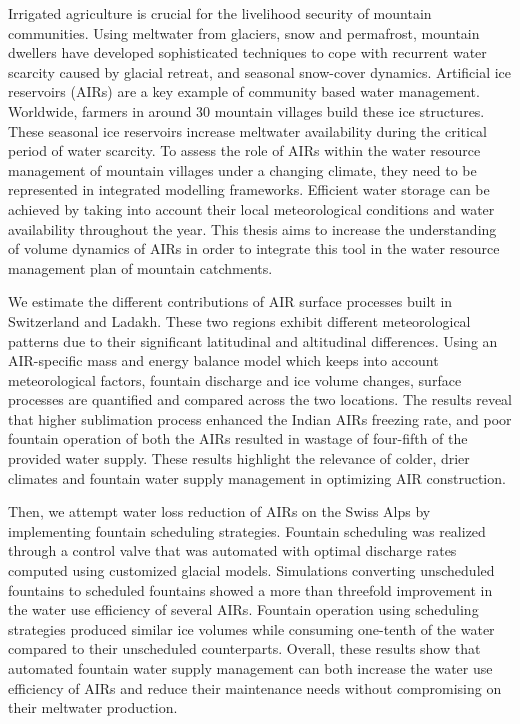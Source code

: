 \label{sec:summary}

Irrigated agriculture is crucial for the livelihood security of mountain communities. Using meltwater from
glaciers, snow and permafrost, mountain dwellers have developed sophisticated techniques to cope with recurrent
water scarcity caused by glacial retreat, and seasonal snow-cover dynamics. Artificial ice
reservoirs (AIRs) are a key example of community based water management. Worldwide, farmers in around 30 mountain
villages build these ice structures. These seasonal ice reservoirs increase meltwater availability during the
critical period of water scarcity. To assess the role of AIRs within the water resource management of
mountain villages under a changing climate, they need to be represented in integrated modelling frameworks.
Efficient water storage can be achieved by taking into account their local meteorological conditions and
water availability throughout the year. This thesis aims to increase the understanding of volume dynamics of
AIRs in order to integrate this tool in the water resource management plan of mountain catchments.

We estimate the different contributions of AIR surface processes built in Switzerland and Ladakh. These two
regions exhibit different meteorological patterns due to their significant latitudinal and altitudinal
differences. Using an AIR-specific mass and energy balance model which keeps into account meteorological
factors, fountain discharge and ice volume changes, surface processes are quantified and compared across the two
locations. The results reveal that higher sublimation process enhanced the Indian AIRs freezing rate, and poor
fountain operation of both the AIRs resulted in wastage of four-fifth of the provided water supply. These
results highlight the relevance of colder, drier climates and fountain water supply management in optimizing AIR
construction.

Then, we attempt water loss reduction of AIRs on the Swiss Alps by implementing fountain scheduling strategies.
Fountain scheduling was realized through a control valve that was automated with optimal discharge rates
computed using customized glacial models. Simulations converting unscheduled fountains to scheduled fountains
showed a more than threefold improvement in the water use efficiency of several AIRs. Fountain operation using
scheduling strategies produced similar ice volumes while consuming one-tenth of the water compared to their
unscheduled counterparts.  Overall, these results show that automated fountain water supply management can both
increase the water use efficiency of AIRs and reduce their maintenance needs without compromising on their
meltwater production.

